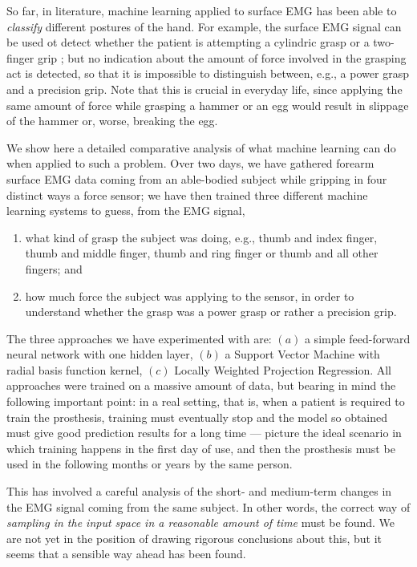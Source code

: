 So far, in literature, machine learning applied to surface EMG has
been able to \emph{classify} different postures of the hand. For
example, the surface EMG signal can be used ot detect whether the
patient is attempting a cylindric grasp or a two-finger grip \cite{};
but no indication about the amount of force involved in the grasping
act is detected, so that it is impossible to distinguish between,
e.g., a power grasp and a precision grip. Note that this is crucial in
everyday life, since applying the same amount of force while grasping
a hammer or an egg would result in slippage of the hammer or, worse,
breaking the egg.

We show here a detailed comparative analysis of what machine learning
can do when applied to such a problem. Over two days, we have gathered
forearm surface EMG data coming from an able-bodied subject while
gripping in four distinct ways a force sensor; we have then trained
three different machine learning systems to guess, from the EMG
signal,

\begin{enumerate}

  \item what kind of grasp the subject was doing, e.g., thumb and index
    finger, thumb and middle finger, thumb and ring finger or thumb
    and all other fingers; and

  \item how much force the subject was applying to the sensor, in
    order to understand whether the grasp was a power grasp or rather
    a precision grip.

\end{enumerate}

The three approaches we have experimented with are: $(a)$ a simple
feed-forward neural network with one hidden layer, $(b)$ a Support
Vector Machine with radial basis function kernel, $(c)$ Locally
Weighted Projection Regression. All approaches were trained on a
massive amount of data, but bearing in mind the following important
point: in a real setting, that is, when a patient is required to train
the prosthesis, training must eventually stop and the model so
obtained must give good prediction results for a long time --- picture
the ideal scenario in which training happens in the first day of use,
and then the prosthesis must be used in the following months or years
by the same person.

This has involved a careful analysis of the short- and medium-term
changes in the EMG signal coming from the same subject. In other
words, the correct way of \emph{sampling in the input space in a reasonable
amount of time} must be found. We are not yet in the position of
drawing rigorous conclusions about this, but it seems that a sensible
way ahead has been found.

